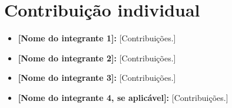 \documentclass[10pt,a4paper]{article}
\begin{document}
\section*{Contribuição individual}

\begin{itemize}[leftmargin=1.2cm,noitemsep,topsep=2pt]
    \item \textbf{[Nome do integrante 1]:} [Contribuições.]
    \item \textbf{[Nome do integrante 2]:} [Contribuições.]
    \item \textbf{[Nome do integrante 3]:} [Contribuições.]
    \item \textbf{[Nome do integrante 4, se aplicável]:} [Contribuições.]
\end{itemize}



\end{document}
